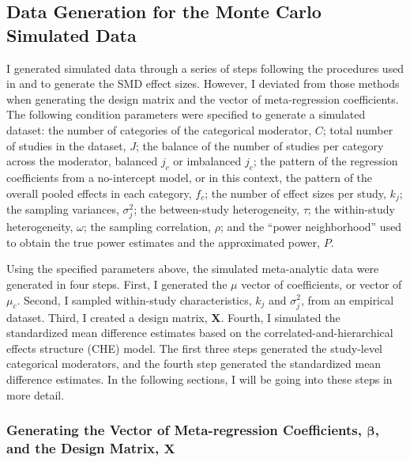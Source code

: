 \subsection{Data Generation for the Monte Carlo Simulated Data}

I generated simulated data through a series of steps following the procedures used in \textcite{vembye2023} and \textcite{pustejovsky2022} to generate the SMD effect sizes. However, I deviated from those methods when generating the design matrix and the vector of meta-regression coefficients. The following condition parameters were specified to generate a simulated dataset: the number of categories of the categorical moderator, $C$; total number of studies in the dataset, $J$; the balance of the number of studies per category across the moderator, balanced $j_c$ or imbalanced $j_c$; the pattern of the regression coefficients from a no-intercept model, or in this context, the pattern of the overall pooled effects in each category, $f_c$; the number of effect sizes per study, $k_j$; the sampling variances, $\sigma_j^2$; the between-study heterogeneity, $\tau$;  the within-study heterogeneity, $\omega$; the sampling correlation, $\rho$; and the ``power neighborhood''  used to obtain the true power estimates and the approximated power, $P$. 

Using the specified parameters above, the simulated meta-analytic data were generated in four steps. First, I generated the $\mu$ vector of coefficients, or vector of $\mu_c$. Second, I sampled within-study characteristics, $k_j$ and $\sigma_j^2$, from an empirical dataset. Third, I created a design matrix, $\bm{X}$. Fourth, I simulated the standardized mean difference estimates based on the correlated-and-hierarchical effects structure (CHE) model. The first three steps generated the study-level categorical moderators, and the fourth step generated the standardized mean difference estimates. In the following sections, I will be going into these steps in more detail.


\subsubsection{Generating the Vector of Meta-regression Coefficients, $\bm{\beta}$, and the Design Matrix, $\bm{X}$} \label{sec:XandBeta}

